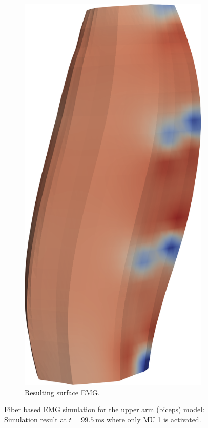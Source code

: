 \begin{figure}[H]
\begin{subfigure}[t]{0.25\textwidth}
    \includegraphics[width=\textwidth]{images/results/application/mu01b.png}%
    \caption{Resulting surface EMG.}%
    \label{fig:mu01b}%
  \end{subfigure}   
  \caption{Fiber based EMG simulation for the upper arm (biceps) model: Simulation result at $t=\SI{99.5}{\milli\second}$ where only MU 1 is activated.}%
  \label{fig:result_mu1}%
\end{figure}%

